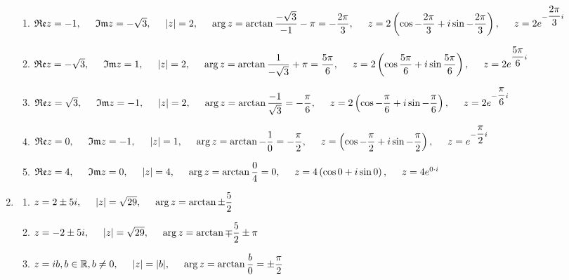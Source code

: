 \documentclass[a4paper,12pt]{article}
\newcommand\tab[1][0.5cm]{\hspace*{#1}}
\renewcommand{\Im}[0]{\mathfrak{Im}}
\renewcommand{\Re}[0]{\mathfrak{Re}}
\begin{document}
\begin{justify}
\begin{enumerate}
\begin{figure*}[htp]
				\end{figure*}
				\begin{enumerate}
					\item $\Re z=-1,\tab\Im z=-\sqrt3,\tab|z|=2,\tab\arg z=\arctan\dfrac{-\sqrt3}{-1}-\pi=-\dfrac{2\pi}{3},\tab \\z=2\left(\cos-\dfrac{2\pi}{3}+i\sin-\dfrac{2\pi}{3}\right),\tab z=2e^{-\dfrac{2\pi}{3}i}$
					\item $\Re z=-\sqrt{3},\tab\Im z=1,\tab|z|=2,\tab\arg z=\arctan\dfrac{1}{-\sqrt3}+\pi=\dfrac{5\pi}{6},\tab \\z=2\left(\cos\dfrac{5\pi}{6}+i\sin\dfrac{5\pi}{6}\right),\tab z=2e^{\dfrac{5\pi}{6}i}$
					\item $\Re z=\sqrt{3},\tab\Im z=-1,\tab|z|=2,\tab\arg z=\arctan\dfrac{-1}{\sqrt3}=-\dfrac{\pi}{6},\tab \\z=2\left(\cos-\dfrac{\pi}{6}+i\sin-\dfrac{\pi}{6}\right),\tab z=2e^{-\dfrac{\pi}{6}i}$
					\item $\Re z=0,\tab\Im z=-1,\tab|z|=1,\tab\arg z=\arctan-\dfrac10=-\dfrac{\pi}{2},\tab \\z=\left(\cos-\dfrac{\pi}{2}+i\sin-\dfrac{\pi}{2}\right),\tab z=e^{-\dfrac{\pi}{2}i}$
					\item $\Re z=4,\tab\Im z=0,\tab|z|=4,\tab\arg z=\arctan\dfrac04=0,\tab \\z=4\left(\cos0+i\sin0\right),\tab z=4e^{0\cdot i}$
				\end{enumerate}
			\item 
				\begin{enumerate}
					\item $z=2\pm5i,\tab |z|=\sqrt{29},\tab\arg z=\arctan\pm\dfrac52$
					\item $z=-2\pm5i,\tab |z|=\sqrt{29},\tab\arg z=\arctan \mp\dfrac52\pm\pi$
					\item $z=ib,b\in\mathbb{R},b\neq0,\tab |z|=|b|,\tab \arg z=\arctan\dfrac b0=\pm\dfrac\pi2$

\end{enumerate}
\end{enumerate}
\end{justify}
\end{document}
